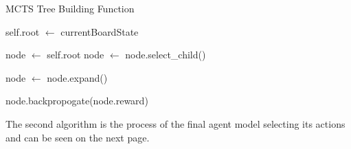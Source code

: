 \documentclass{article}
\begin{document}
    \begin{algorithm}
        \caption{MCTS Tree Building Function}\label{alg:cap}
        \begin{algorithmic}
        
        \State self.root $\gets$ currentBoardState

        \State node $\gets$ self.root 
        \State node $\gets$ node.select_child()
        \EndIf
        
        \State node $\gets$ node.expand() 
        \EndWhile

        \State node.backpropogate(node.reward)
        \EndFor
        \EndFunction
        \end{algorithmic}
    \end{algorithm}
    
    The second algorithm is the process of the final agent model selecting its actions and can be seen on the next page.
\end{document}
